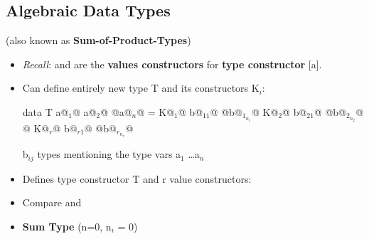 

\subsection{Algebraic Data Types}

(also known as \textbf{Sum-of-Product-Types})

\begin{itemize}
  \item \textit{Recall}: \codeline{[]} and \codeline{(:)} are the \textbf{values constructors} for \textbf{type constructor} [a]. 
  \item Can define entirely new type T and its constructors K$_i$:\\
        \begin{Haskell}
data T a@$_1$@ a@$_2$@ @\dots@ a@$_n$@ = K@$_1$@ b@$_{11}$@ @\dots@ b@$_{1_{n_1}}$@
                     K@$_2$@ b@$_{21}$@ @\dots@ b@$_{2_{n_2}}$@
                     @\dots@
                     K@$_r$@ b@$_{r1}$@ @\dots@ b@$_{r_{n_r}}$@
        \end{Haskell}
        
        b$_{ij}$ types mentioning the type vars a$_1$ \dots a$_n$

  \item Defines type constructor T and r value constructors:\\
  \item Compare \codeline{[] :: [a]} and 
  \item \textbf{Sum Type} (n=0, n$_i$ = 0) \\


\end{itemize}
